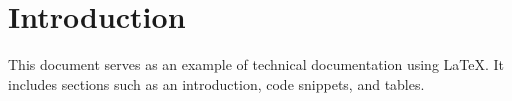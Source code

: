 \section{Introduction}
This document serves as an example of technical documentation using LaTeX. It includes sections such as an introduction, code snippets, and tables.
